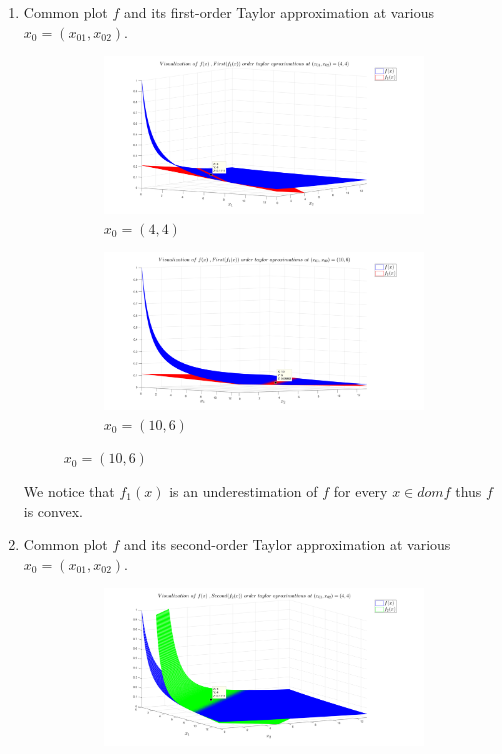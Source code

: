 \documentclass[12pt]{article}
\begin{document}
\begin{enumerate}
\begin{enumerate}
\item 
Common plot $f$ and its first-order Taylor approximation at various $x_0=(x_{01},x_{02})$.
\begin{figure}[!h]
	\begin{subfigure}[b]{0.5\textwidth}
		\centering
		\includegraphics[width=\textwidth]{7a.png}
		\caption{$x_0=(4,4)$}
		\label{fig:7a}
	\end{subfigure}
	\hfill
	\begin{subfigure}[b]{0.5\textwidth}
		\centering
		\includegraphics[width=\textwidth]{7b.png}
		\caption{$x_0=(10,6)$}
		\label{fig:7b}
	\end{subfigure}
\end{figure}
We notice that $f_1(x)$ is an underestimation of $f$ for every $x\in domf$ thus $f$ is convex.
\newpage
\item 
Common plot $f$ and its second-order Taylor approximation at various $x_0=(x_{01},x_{02})$.
\begin{figure}[!h]
	\begin{subfigure}[b]{0.5\textwidth}
		\centering
		\includegraphics[width=\textwidth]{8a.png}

\end{subfigure}
\end{figure}
\end{enumerate}
\end{enumerate}
\end{document}
